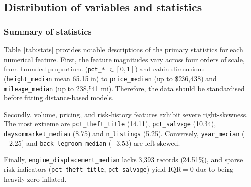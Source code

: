 \documentclass[11pt,a4paper]{article}
\numberwithin{table}{section}
\numberwithin{figure}{section}
\begin{document}
\subsection{Distribution of variables and statistics}
\label{sec:distribution}
\subsubsection{Summary of statistics}
\label{sec:summary-stats}
Table~\ref{tab:stats} provides notable descriptions of the primary statistics for each numerical feature. First, the feature magnitudes vary across four orders of scale, from bounded proportions (\texttt{pct\_*} $\in [0,1]$) and cabin dimensions (\texttt{height\_median} mean 65.15 in) to \texttt{price\_median} (up to \$236,438) and \texttt{mileage\_median} (up to 238,541 mi). Therefore, the data should be standardised before fitting distance-based models.

Secondly, volume, pricing, and risk-history features exhibit severe right-skewness. The most extreme are \texttt{pct\_theft\_title} (14.11), \texttt{pct\_salvage} (10.34), \texttt{daysonmarket\_median} (8.75) and \texttt{n\_listings} (5.25). Conversely, \texttt{year\_median} ($-2.25$) and \texttt{back\_legroom\_median} ($-3.53$) are left-skewed.

Finally, \texttt{engine\_displacement\_median} lacks 3,393 records (24.51\%), and sparse risk indicators (\texttt{pct\_theft\_title}, \texttt{pct\_salvage}) yield $\mathrm{IQR}=0$ due to being heavily zero-inflated.
\end{document}
